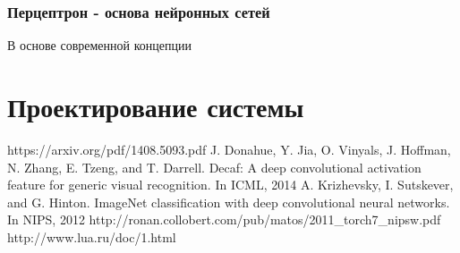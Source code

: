 \documentclass[a4paper,english,russian]{G2-105}
\begin{document}
\subsection{Перцептрон - основа нейронных сетей}
\par В основе современной концепции 

\chapter{Проектирование системы}


\newpage
{}
\newpage
\begin{thebibliography}{1}
     https://arxiv.org/pdf/1408.5093.pdf
     J. Donahue, Y. Jia, O. Vinyals, J. Hoffman, N. Zhang, 
E. Tzeng, and T. Darrell. Decaf: A deep convolutional
activation feature for generic visual recognition. In ICML,
2014
  	  A. Krizhevsky, I. Sutskever, and G. Hinton. ImageNet
classification with deep convolutional neural networks. In
NIPS, 2012
	 http://ronan.collobert.com/pub/matos/2011\_torch7\_nipsw.pdf
	 http://www.lua.ru/doc/1.html
\end{thebibliography}


\end{document}
